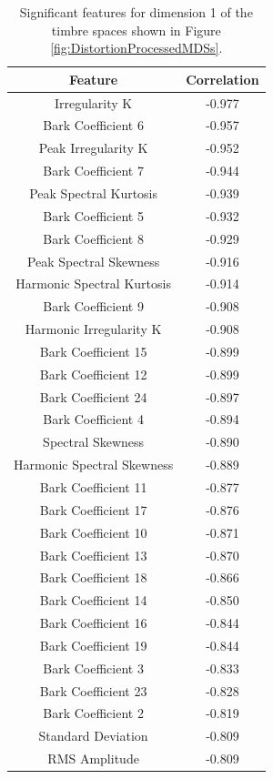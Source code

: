		\begin{table}[h!]
			\centering
			\begin{tabular}{|c|c|}
				\hline
				\bf{Feature} & \bf{Correlation} \\
				\hline
				\hline
				Irregularity K & -0.977 \\
				\hline
				Bark Coefficient 6 & -0.957 \\
				\hline
				Peak Irregularity K & -0.952 \\
				\hline
				Bark Coefficient 7 & -0.944 \\
				\hline
				Peak Spectral Kurtosis & -0.939 \\
				\hline
				Bark Coefficient 5 & -0.932 \\
				\hline
				Bark Coefficient 8 & -0.929 \\
				\hline
				Peak Spectral Skewness & -0.916 \\
				\hline
				Harmonic Spectral Kurtosis & -0.914 \\
				\hline
				Bark Coefficient 9 & -0.908 \\
				\hline
				Harmonic Irregularity K & -0.908 \\
				\hline
				Bark Coefficient 15 & -0.899 \\
				\hline
				Bark Coefficient 12 & -0.899 \\
				\hline
				Bark Coefficient 24 & -0.897 \\
				\hline
				Bark Coefficient 4 & -0.894 \\
				\hline
				Spectral Skewness & -0.890 \\
				\hline
				Harmonic Spectral Skewness & -0.889 \\
				\hline
				Bark Coefficient 11 & -0.877 \\
				\hline
				Bark Coefficient 17 & -0.876 \\
				\hline
				Bark Coefficient 10 & -0.871 \\
				\hline
				Bark Coefficient 13 & -0.870 \\
				\hline
				Bark Coefficient 18 & -0.866 \\
				\hline
				Bark Coefficient 14 & -0.850 \\
				\hline
				Bark Coefficient 16 & -0.844 \\
				\hline
				Bark Coefficient 19 & -0.844 \\
				\hline
				Bark Coefficient 3 & -0.833 \\
				\hline
				Bark Coefficient 23 & -0.828 \\
				\hline
				Bark Coefficient 2 & -0.819 \\
				\hline
				Standard Deviation & -0.809 \\
				\hline
				RMS Amplitude & -0.809 \\
				\hline
			\end{tabular}
			\caption{Significant features for dimension 1 of the timbre spaces shown in Figure 
				 \ref{fig:DistortionProcessedMDSs}.}
			\label{tab:DistortionProcessedFeaturesDim1}
		\end{table}


